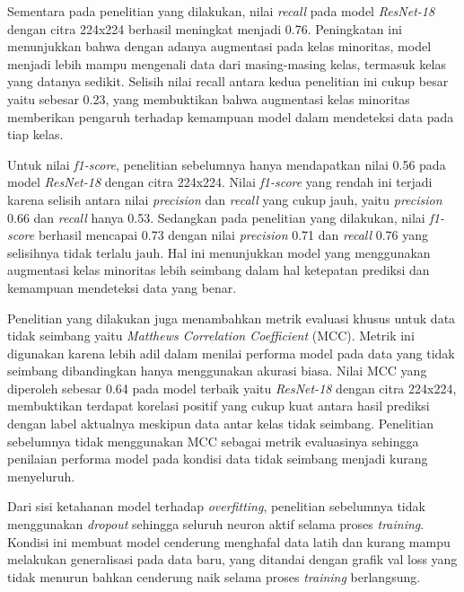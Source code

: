 Sementara pada penelitian yang dilakukan, nilai \textit{recall} pada model 
\textit{ResNet-18} dengan citra 224x224 berhasil meningkat menjadi 0.76. 
Peningkatan ini menunjukkan bahwa dengan adanya augmentasi pada kelas 
minoritas, model menjadi lebih mampu mengenali data dari masing-masing 
kelas, termasuk kelas yang datanya sedikit. Selisih nilai recall antara 
kedua penelitian ini cukup besar yaitu sebesar 0.23, yang membuktikan 
bahwa augmentasi kelas minoritas memberikan pengaruh terhadap 
kemampuan model dalam mendeteksi data pada tiap kelas. \par

Untuk nilai \textit{f1-score}, penelitian sebelumnya hanya mendapatkan nilai 0.56 
pada model \textit{ResNet-18} dengan citra 224x224. Nilai \textit{f1-score} yang rendah ini 
terjadi karena selisih antara nilai \textit{precision} dan \textit{recall} yang cukup jauh, 
yaitu \textit{precision} 0.66 dan \textit{recall} hanya 0.53. Sedangkan pada penelitian 
yang dilakukan, nilai \textit{f1-score} berhasil mencapai 0.73 dengan nilai 
\textit{precision} 0.71 dan \textit{recall} 0.76 yang selisihnya tidak terlalu jauh. Hal ini 
menunjukkan model yang menggunakan augmentasi kelas minoritas lebih 
seimbang dalam hal ketepatan prediksi dan kemampuan mendeteksi data yang 
benar. \par

Penelitian yang dilakukan juga menambahkan metrik evaluasi khusus untuk 
data tidak seimbang yaitu \textit{Matthews Correlation Coefficient} (MCC). 
Metrik ini digunakan karena lebih adil dalam menilai performa model pada 
data yang tidak seimbang dibandingkan hanya menggunakan akurasi biasa. 
Nilai MCC yang diperoleh sebesar 0.64 pada model terbaik yaitu \textit{ResNet-18} 
dengan citra 224x224, membuktikan terdapat korelasi positif yang cukup 
kuat antara hasil prediksi dengan label aktualnya meskipun data antar 
kelas tidak seimbang. Penelitian sebelumnya tidak menggunakan MCC sebagai 
metrik evaluasinya sehingga penilaian performa model pada kondisi data 
tidak seimbang menjadi kurang menyeluruh. \par

Dari sisi ketahanan model terhadap \textit{overfitting}, penelitian 
sebelumnya tidak menggunakan \textit{dropout} sehingga seluruh neuron aktif selama 
proses \textit{training}. Kondisi ini membuat model cenderung menghafal data latih 
dan kurang mampu melakukan generalisasi pada data baru, yang ditandai 
dengan grafik val loss yang tidak menurun bahkan cenderung naik selama 
proses \textit{training} berlangsung. \par

